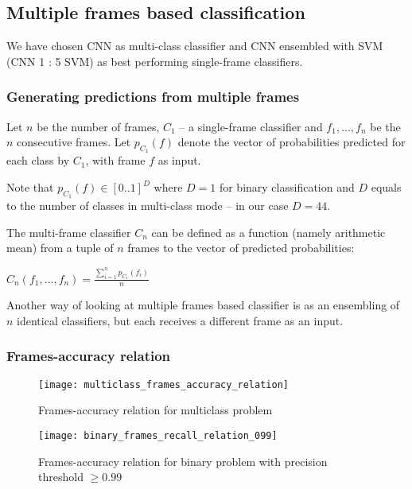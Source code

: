     \subsection{Multiple frames based classification}
    We have chosen CNN as multi-class classifier and CNN ensembled with SVM (CNN 1 : 5 SVM) as
    best performing single-frame classifiers.

    \subsubsection{Generating predictions from multiple frames}
    Let $n$ be the number of frames, $C_{1}$ -- a single-frame classifier and
    $f_1, ..., f_n$ be the $n$ consecutive frames.
    Let $p_{C_{1}}(f)$ denote the vector of probabilities predicted for each class by $C_{1}$,
    with frame $f$ as input.

    Note that $p_{C_{1}}(f) \in [0..1]^D$ where $D = 1$ for binary classification
    and $D$ equals to the number of classes in multi-class mode -- in our case $D = 44$.


    The multi-frame classifier $C_{n}$ can be defined as a function (namely arithmetic mean)
    from a tuple of $n$ frames to the vector of predicted probabilities:

    \begin{center}
    $C_{n}(f_1, ..., f_n) = \frac{\sum\limits_{i=1}^{n}{p_{C_{1}}(f_{i})}}{n}$
    \end{center}

    Another way of looking at multiple frames based classifier is as an ensembling
    of $n$ identical classifiers, but each receives a different frame as an input.

    \subsubsection{Frames-accuracy relation}
    \begin{figure}[H]
    \caption{Frames-accuracy relation for multiclass problem}
    \centering
    \texttt{[image: multiclass\_frames\_accuracy\_relation]}
    \end{figure}

    \begin{figure}[H]
    \caption{Frames-accuracy relation for binary problem with precision threshold $\geqslant 0.99$}
    \centering
    \texttt{[image: binary\_frames\_recall\_relation\_099]}
    \end{figure}

